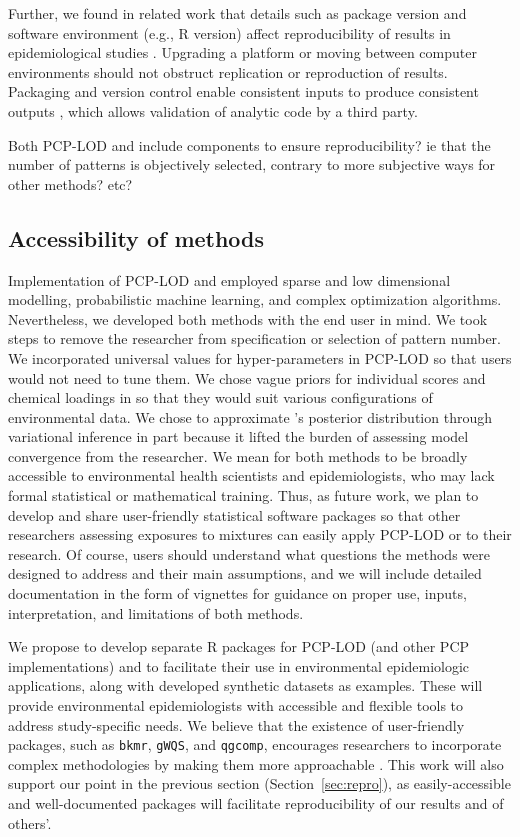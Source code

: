 Further, we found in related work that details such as package version and software environment (e.g., R version) affect reproducibility of results in epidemiological studies \citep{nunez2020reflection}. Upgrading a platform or moving between computer environments should not obstruct replication or reproduction of results. Packaging and version control enable consistent inputs to produce consistent outputs \citep{wilson2014best}, which allows validation of analytic code by a third party.

Both PCP-LOD and \bnmf include components to ensure reproducibility? ie that the number of patterns is objectively selected, contrary to more subjective ways for other methods? etc?


\subsection{Accessibility of methods}
Implementation of PCP-LOD and \bnmf employed sparse and low dimensional modelling, probabilistic machine learning, and complex optimization algorithms. Nevertheless, we developed both methods with the end user in mind. We took steps to remove the researcher from specification or selection of pattern number. We incorporated universal values for hyper-parameters in PCP-LOD so that users would not need to tune them. We chose vague priors for individual scores and chemical loadings in \bnmf so that they would suit various configurations of environmental data. We chose to approximate \bnmfc's posterior distribution through variational inference in part because it lifted the burden of assessing model convergence from the researcher. We mean for both methods to be broadly accessible to environmental health scientists and epidemiologists, who may lack formal statistical or mathematical training. Thus, as future work, we plan to develop and share user-friendly statistical software packages so that other researchers assessing exposures to mixtures can easily apply PCP-LOD or \bnmf to their research. Of course, users should understand what questions the methods were designed to address and their main assumptions, and we will include detailed documentation in the form of vignettes for guidance on proper use, inputs, interpretation, and limitations of both methods.

We propose to develop separate R packages for PCP-LOD (and other PCP implementations) and \bnmf to facilitate their use in environmental epidemiologic applications, along with developed synthetic datasets as examples. These will provide environmental epidemiologists with accessible and flexible tools to address study-specific needs. We believe that the existence of user-friendly packages, such as \texttt{bkmr}, \texttt{gWQS}, and \texttt{qgcomp}, encourages researchers to incorporate complex methodologies by making them more approachable \citep{bobb2018statistical, renzetti2016gwqs, keil2020quantile}. This work will also support our point in the previous section (Section~\ref{sec:repro}), as easily-accessible and well-documented packages will facilitate reproducibility of our results and of others'.

